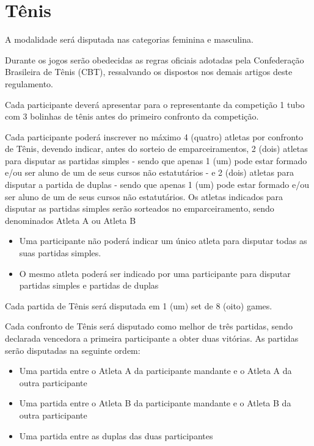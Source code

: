 {\let\clearpage\relax \chapter{Tênis}}

\begin{article}
	A modalidade será disputada nas categorias feminina e masculina.
\end{article}

\begin{article}
	Durante os jogos serão obedecidas as regras oficiais adotadas pela Confederação Brasileira de Tênis (CBT), ressalvando os dispostos nos demais artigos deste regulamento.
\end{article}

\begin{article}
	Cada participante deverá apresentar para o representante da competição 1 tubo com 3 bolinhas de tênis antes do primeiro confronto da competição.
\end{article}

\begin{article}
	Cada participante poderá inscrever no máximo 4 (quatro) atletas por confronto de Tênis, devendo indicar, antes do sorteio de emparceiramentos, 2 (dois) atletas para disputar as partidas simples - sendo que apenas 1 (um) pode estar formado e/ou ser aluno de um de seus cursos não estatutários - e 2 (dois) atletas para disputar a partida de duplas - sendo que apenas 1 (um) pode estar formado e/ou ser aluno de um de seus cursos não estatutários. Os atletas indicados para disputar as partidas simples serão sorteados no emparceiramento, sendo denominados Atleta A ou Atleta B

	\begin{itemize}[noitemsep]
		\item Uma participante não poderá indicar um único atleta para disputar todas as suas partidas simples.
		\item O mesmo atleta poderá ser indicado por uma participante para disputar partidas simples e partidas de duplas
	\end{itemize}

	Cada partida de Tênis será disputada em 1 (um) set de 8 (oito) games.
\end{article}

\noindent
Cada confronto de Tênis será disputado como melhor de três partidas, sendo declarada vencedora a primeira participante a obter duas vitórias. As partidas serão disputadas na seguinte ordem:
\begin{itemize}[noitemsep]
	\item Uma partida entre o Atleta A da participante mandante e o Atleta A da outra participante
	\item Uma partida entre o Atleta B da participante mandante e o Atleta B da outra participante
	\item Uma partida entre as duplas das duas participantes
\end{itemize}

